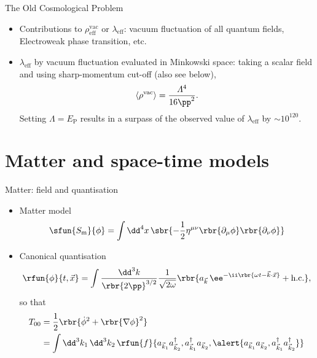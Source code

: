 \documentclass{beamer}
\begin{document}
\begin{frame}{The Old Cosmological Problem}
\begin{itemize}

\item Contributions to $\rho^\text{vac}_\text{eff}$ or $\lambda_\text{eff}$:
vacuum fluctuation of all quantum fields, Electroweak phase transition, etc.

\item $\lambda_\text{eff}$ by vacuum fluctuation evaluated in Minkowski space:
taking a scalar field and using sharp-momentum cut-off (also see below),
\begin{equation}
\left<\rho^\text{vac}\right> = \frac{\varLambda^4}{16\pp^2}.
\end{equation}
Setting $\varLambda = E_\text{P}$ results in a surpass of the observed value of
$\lambda_\text{eff}$ by $\sim 10^{120}$.

\end{itemize}

\end{frame}

\section{Matter and space-time models}

\begin{frame}{Matter: field and quantisation}

\begin{itemize}
\item Matter model
\begin{equation}
\sfun{S_\text{m}}{\phi} = \int \dd^4 x\,\sbr{-\frac{1}{2}\eta^{\mu\nu}
\rbr{\partial_\mu \phi}\rbr{\partial_\nu \phi}}
\end{equation}
\item Canonical quantisation
\begin{equation}
\rfun{\phi}{t,\vec{x}} = \int\frac{\dd^3 k}{\rbr{2\pp}^{3/2}} 
\frac{1}{\sqrt{2\omega}}
\rbr{a_{\vec{k}} \,\ee^{-\ii\rbr{\omega t - \vec{k}\cdot\vec{x}}} + 
\text{h.c.}},
\end{equation}
so that
\begin{align}
T_{00} &= \frac{1}{2}\rbr{\dot{\phi}^2 + \rbr{\nabla\phi}^2} \\
&= \int\dd^3 k_1\,\dd^3 k_2\,
\rfun{f}{a_{\vec{k}_1} a_{\vec{k}_2}^\dagger, a_{\vec{k}_1}^\dagger 
a_{\vec{k}_2}, \alert{a_{\vec{k}_1} a_{\vec{k}_2}, a_{\vec{k}_1}^\dagger 
a_{\vec{k}_2}^\dagger}}
\end{align}
\end{itemize}


\end{frame}
\end{document}
